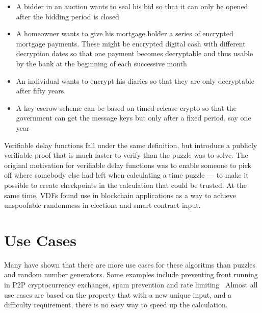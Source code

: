 \begin{itemize}
	\item A bidder in an auction wants to seal his bid so that it can only be opened after the bidding period is closed 
	\item A homeowner wants to give his mortgage holder a series of encrypted mortgage payments. These might be encrypted digital cash with different decryption dates so that one payment becomes decryptable and thus usable by the bank at the beginning of each successive month
	\item An individual wants to encrypt his diaries so that they are only decryptable after fifty years.
	\item A key escrow scheme can be based on timed-release crypto so that the government can get the message keys but only after a fixed period, say one year
\end{itemize}

Verifiable delay functions fall under the same definition, but introduce a publicly verifiable proof that is much faster to verify than the puzzle was to solve. The original motivation for verifiable delay functions was to enable someone to pick off where somebody else had left when calculating a time puzzle --- to make it possible to create checkpoints in the calculation that could be trusted. At the same time, VDFs found use in blockchain applications as a way to achieve unspoofable randomness in elections and smart contract input.

\section{Use Cases}
Many have shown that there are more use cases for these algoritms than puzzles and random number generators. Some examples include preventing front running in P2P cryptocurrency exchanges, spam prevention and rate limiting~\cite{noauthor_undated-hk} Almost all use cases are based on the property that with a new unique input, and a difficulty requirement, there is no easy way to speed up the calculation.


